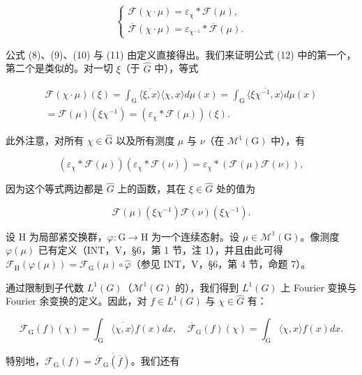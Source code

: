 \[
\left\{ \begin{array}{l} \mathcal {F} (\chi \cdot \mu) = \varepsilon_ {\chi} * \mathcal {F} (\mu), \\ \overline {{\mathcal {F}}} (\chi \cdot \mu) = \varepsilon_ {\chi^ {- 1}} * \overline {{\mathcal {F}}} (\mu). \end{array} \right.
\]

公式 (8)、(9)、(10) 与 (11) 由定义直接得出。我们来证明公式 (12) 中的第一个，第二个是类似的。对一切 \(\xi\)（于 \(\widehat{G}\) 中），等式

\[
\begin{array}{c} \mathcal {F} (\chi \cdot \mu) (\xi) = \int_ {\mathrm{G}} \overline {{\langle \xi , x \rangle}} \langle \chi , x \rangle d \mu (x) = \int_ {\mathrm{G}} \overline {{\langle \xi \chi^ {- 1} , x \rangle}} d \mu (x) \\ = \mathcal {F} (\mu) (\xi \chi^ {- 1}) = (\varepsilon_ {\chi} * \mathcal {F} (\mu)) (\xi). \end{array}
\]

此外注意，对所有 \(\chi\in\widehat{\mathrm{G}}\) 以及所有测度 \(\mu\) 与 \(\nu\)（在 \(\mathcal{M}^{1}(\mathrm{G})\) 中），有

\[
(\varepsilon_ {\chi} * \mathcal {F} (\mu)) (\varepsilon_ {\chi} * \mathcal {F} (\nu)) = \varepsilon_ {\chi} * (\mathcal {F} (\mu) \mathcal {F} (\nu)),\tag{13}
\]

因为这个等式两边都是 \(\widehat{G}\) 上的函数，其在 \(\xi\in\widehat{G}\) 处的值为

\[
\mathcal {F} (\mu) (\xi \chi^ {- 1}) \mathcal {F} (\nu) (\xi \chi^ {- 1}).
\]

设 H 为局部紧交换群，\(\varphi\colon\mathrm{G}\to\mathrm{H}\) 为一个连续态射。设 \(\mu\in\mathcal{M}^{1}(\mathrm{G})\)。像测度 \(\varphi(\mu)\) 已有定义（INT，V，§6，第 1 节，注 1），并且由此可得 \(\mathcal{F}_{\mathrm{H}}(\varphi(\mu))=\mathcal{F}_{\mathrm{G}}(\mu)\circ\widehat{\varphi}\)（参见 INT，V，§6，第 4 节，命题 7）。

通过限制到子代数 \(L^{1}(G)\)（\(\mathcal{M}^{1}(G)\) 的），我们得到 \(L^{1}(G)\) 上 Fourier 变换与 Fourier 余变换的定义。因此，对 \(f \in L^{1}(G)\) 与 \(\chi \in \widehat{G}\) 有：

\[
\mathcal {F} _ {\mathrm{G}} (f) (\chi) = \int_ {\mathrm{G}} \overline {{\langle \chi , x \rangle}} f (x) d x, \quad \overline {{\mathcal {F}}} _ {\mathrm{G}} (f) (\chi) = \int_ {\mathrm{G}} \langle \chi , x \rangle f (x) d x.\tag{14}
\]

特别地，\(\mathcal{F}_{\mathrm{G}}(f) = \overline{\overline{\mathcal{F}}_{\mathrm{G}}(\overline{f})}\)。我们还有

